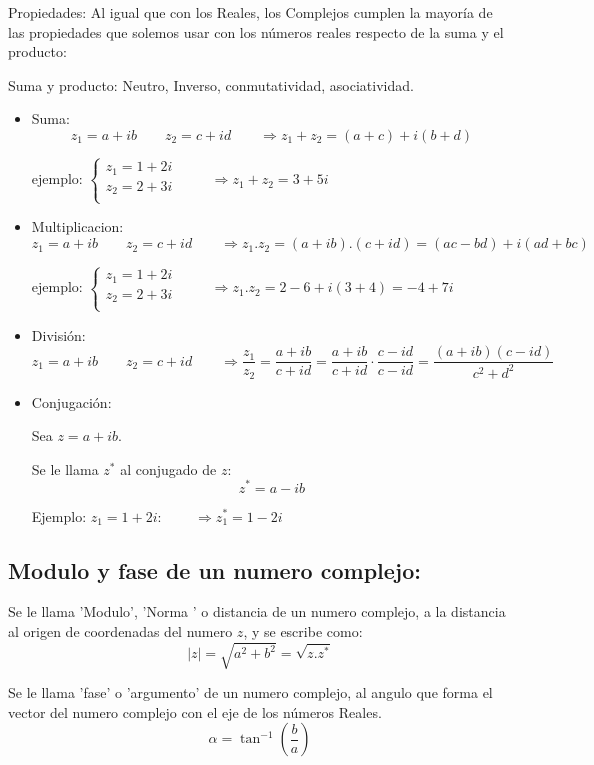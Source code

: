 \documentclass[a4paper,11pt,spanish,sans]{exam}
\begin{document}
Propiedades:
Al igual que con los Reales, los Complejos cumplen la mayoría de las propiedades que solemos usar con los números reales respecto de la suma y el producto:

Suma y producto: Neutro, Inverso, conmutatividad, asociatividad.

\begin{itemize}
	\item Suma:
	\[z_1=a+ib \qquad z_2=c+id \qquad \Rightarrow z_1+z_2=(a+c) + i(b+d)\]
	
	ejemplo: $ \begin{cases}
	z_1=1+2i\\ 
	z_2=2+3i\\
	\end{cases}$  $\qquad \Rightarrow   z_1+z_2=3+5i$
	
	\item Multiplicacion:
	\[z_1=a+ib \qquad z_2=c+id \qquad \Rightarrow z_1.z_2=(a+ib).(c+id)= (ac-bd)  +  i(ad+bc)\]
	
	ejemplo: $ \begin{cases}
	z_1=1+2i\\ 
	z_2=2+3i\\
	\end{cases}$  $\qquad \Rightarrow z_1.z_2=2-6+i(3+4)=-4+7i$
	
	\item División:
	\[z_1=a+ib \qquad z_2=c+id \qquad \Rightarrow \dfrac{z_1}{z_2}=\dfrac{a+ib}{c+id}=\dfrac{a+ib}{c+id}\cdot\dfrac{c-id}{c-id} =\dfrac{(a+ib)(c-id)}{c^2+d^2}\]
	
	\item Conjugación:
	
	Sea $z=a+ib$. 
	
	Se le llama $z^*$ al conjugado de $z$: \[z^*=a - ib\]
	
	Ejemplo: $z_1=1+2i$:  $\qquad \Rightarrow z_1^*=1-2i$
	
	 
\end{itemize}


\subsection*{Modulo y fase de un numero complejo:}

Se le llama 'Modulo', 'Norma ' o distancia de un numero complejo, a la distancia al origen de coordenadas del numero $z$, y se escribe como:
\[|z|=\sqrt{a^2+b^2}=\sqrt{z.z^*}\]

Se le llama 'fase' o 'argumento' de un numero complejo, al angulo que forma el vector del numero complejo con el eje de los números Reales.
\[\alpha=\tan^{-1} \left( \frac{b}{a} \right) \]
\end{document}
